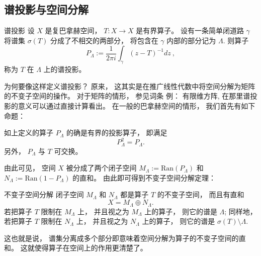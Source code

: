 

\subsection{谱投影与空间分解}
\begin{definition}{谱投影}
设 $X$ 是复巴拿赫空间， $T:X\to X$ 是有界算子。 设有一条简单闭道路 $\gamma$ 将谱集 $\sigma(T)$ 分成了不相交的两部分， 将包含在 $\gamma$ 内部的部分记为 $\Lambda$. 则算子
$$
P_\Lambda:=\frac{1}{2\pi i}\int_\gamma(z-T)^{-1}dz~,
$$
称为 $T$ 在 $\Lambda$ 上的谱投影。
\end{definition}

为何要像这样定义谱投影？ 原来， 这其实是在推广线性代数中将空间分解为矩阵的不变子空间的操作。 对于矩阵的情形， 参见词条 例： 有限维方阵, 在那里谱投影的意义可以通过直接计算看出。 在一般的巴拿赫空间的情形， 我们首先有如下命题：

\begin{lemma}{}
如上定义的算子 $P_\Lambda$ 的确是有界的投影算子， 即满足
$$
P_\Lambda^2=P_\Lambda.
$$
另外， $P_\Lambda$ 与 $T$ 可交换。
\end{lemma}

由此可见， 空间 $X$ 被分成了两个闭子空间 $M_\Lambda:=\text{Ran}(P_\Lambda)$ 和 $N_\Lambda:=\text{Ran}(1-P_\Lambda)$ 的直和。 由此即可得到不变子空间分解定理：

\begin{theorem}{不变子空间分解}
闭子空间 $M_\Lambda$ 和 $N_\Lambda$ 都是算子 $T$ 的不变子空间， 而且有直和
$$
X=M_\Lambda\oplus N_\Lambda.
$$
若把算子 $T$ 限制在 $M_\Lambda$ 上， 并且视之为 $M_\Lambda$ 上的算子， 则它的谱是 $\Lambda$; 同样地， 若把算子 $T$ 限制在 $N_\Lambda$ 上， 并且视之为 $N_\Lambda$ 上的算子， 则它的谱是 $\sigma(T)\setminus\Lambda$.
\end{theorem}

这也就是说， 谱集分离成多个部分即意味着空间分解为算子的不变子空间的直和。 这就使得算子在空间上的作用更清楚了。

